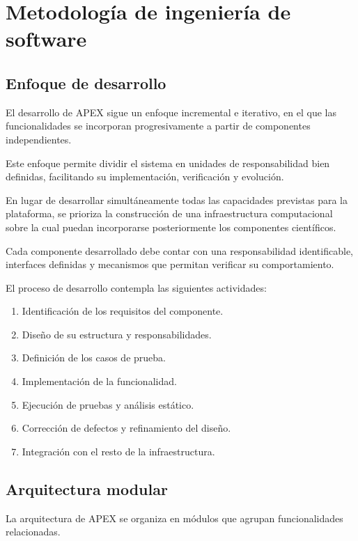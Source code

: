 
\chapter{Metodología de ingeniería de software}
\label{chap:engineering-methodology}

\section{Enfoque de desarrollo}

El desarrollo de APEX sigue un enfoque incremental e iterativo,
en el que las funcionalidades se incorporan progresivamente
a partir de componentes independientes.

Este enfoque permite dividir el sistema en unidades de
responsabilidad bien definidas, facilitando su implementación,
verificación y evolución.

En lugar de desarrollar simultáneamente todas las capacidades
previstas para la plataforma, se prioriza la construcción
de una infraestructura computacional sobre la cual puedan
incorporarse posteriormente los componentes científicos.

Cada componente desarrollado debe contar con una
responsabilidad identificable, interfaces definidas y
mecanismos que permitan verificar su comportamiento.

El proceso de desarrollo contempla las siguientes actividades:

\begin{enumerate}
    \item Identificación de los requisitos del componente.
    \item Diseño de su estructura y responsabilidades.
    \item Definición de los casos de prueba.
    \item Implementación de la funcionalidad.
    \item Ejecución de pruebas y análisis estático.
    \item Corrección de defectos y refinamiento del diseño.
    \item Integración con el resto de la infraestructura.
\end{enumerate}

\section{Arquitectura modular}

La arquitectura de APEX se organiza en módulos que agrupan
funcionalidades relacionadas.

